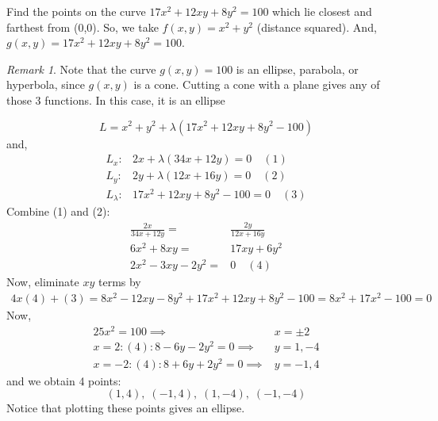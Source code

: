 \documentclass[12pt]{book}
\theoremstyle{definition}
\theoremstyle{remark}
\newtheorem*{remark}{Remark}
\begin{document}
  \begin{example}Find the points on the curve $17x^2 + 12 xy + 8y^2 = 100$ which lie closest and farthest from (0,0). So, we take $f(x,y) = x^2+y^2 $ (distance squared). And, $g(x,y) =17x^2 + 12 xy + 8y^2 = 100 $. 
    \begin{remark} 
      Note that the curve $g(x,y) = 100$ is an ellipse, parabola, or hyperbola, since $g(x,y)$ is a cone. Cutting a cone with a plane gives any of those 3 functions. In this case, it is an ellipse 
    \end{remark}
    $$L = x^2 + y^2 + \lambda(17x^2 + 12 xy + 8y^2- 100 ) $$
    and, 
    \begin{equation*}
      \begin{split}
        L_x :& 2x + \lambda ( 34x + 12 y) = 0 \quad (1)\\ 
        L_y :& 2y + \lambda (12 x + 16 y ) = 0 \quad (2)\\ 
        L_\lambda:& 17x^2 + 12 xy + 8y^2 -100 = 0 \quad (3)
      \end{split}
    \end{equation*}
    Combine (1) and (2):
    \begin{equation*}
      \begin{split}
        \frac{2x}{34x + 12 y} =& \frac{2y}{12x+ 16 y} \\ 
        6x^2 + 8xy =& 17 xy + 6y^2\\ 
        2x^2 - 3xy - 2y^2 =& 0 \quad (4)
      \end{split}
    \end{equation*}
    Now, eliminate $xy$ terms by 
    \begin{equation*}
      \begin{split}
        4x(4) + (3) = 8 x^2 - 12xy - 8y^2 + 17 x^2 + 12xy + 8y^2 -100  = 8x^2 + 17x^2 -100 = 0 
      \end{split}
    \end{equation*}
    Now, 
    \begin{equation*}
      \begin{split}
        25x^2 = 100 \implies& x= \pm 2 \\ 
        x= 2: (4): 8-6y -2y^2 = 0 \implies& y = 1, -4\\ 
        x = -2: (4): 8 + 6y + 2y^2 = 0 \implies& y = -1,4 
      \end{split}
    \end{equation*}
    and we obtain 4 points: $$(1,4), \; (-1, 4), \; (1, -4), \; (-1,-4)$$
    Notice that plotting these points gives an ellipse. 
    \end{example}
\end{document}
